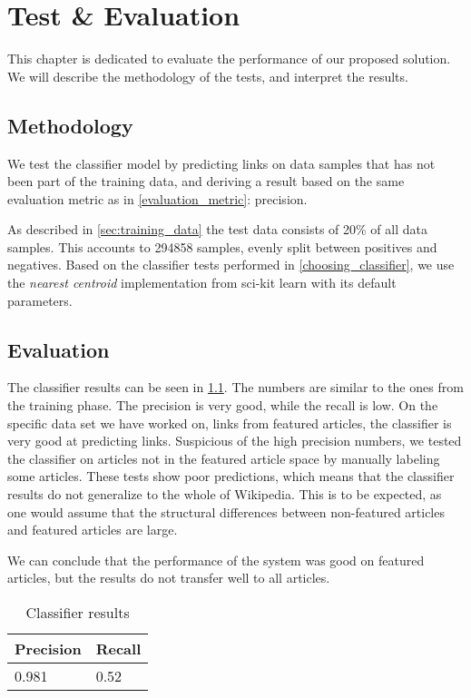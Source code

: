 \chapter{Test \& Evaluation}\label{chap:testeval}
This chapter is dedicated to evaluate the performance of our proposed solution. We will describe the methodology of the tests, and interpret the results.

\section{Methodology}
We test the classifier model by predicting links on data samples that has not been part of the training data, and deriving a result based on the same evaluation metric as in \cref{evaluation_metric}: precision.

As described in \cref{sec:training_data} the test data consists of 20\% of all data samples. This accounts to \num{294858} samples, evenly split between positives and negatives. Based on the classifier tests performed in \cref{choosing_classifier}, we use the \emph{nearest centroid} implementation from sci-kit learn with its default parameters.

\section{Evaluation}
The classifier results can be seen in \cref{eval-results}. The numbers are similar to the ones from the training phase. The precision is very good, while the recall is low. On the specific data set we have worked on, links from featured articles, the classifier is very good at predicting links. Suspicious of the high precision numbers, we tested the classifier on articles not in the featured article space by manually labeling some articles. These tests show poor predictions, which means that the classifier results do not generalize to the whole of Wikipedia. This is to be expected, as one would assume that the structural differences between non-featured articles and featured articles are large.

We can conclude that the performance of the system was good on featured articles, but the results do not transfer well to all articles.

\begin{table}[htbp]
\centering
\begin{tabular}{@{}ll@{}}
\toprule
Precision     & Recall       \\ \midrule
\num{0.981} & \num{0.52}
\end{tabular}
\caption{Classifier results}\label{eval-results}
\end{table}


